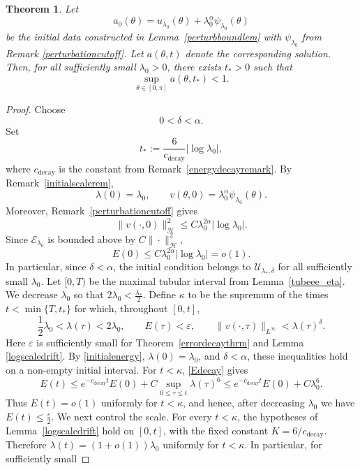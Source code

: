 \documentclass[11pt,a4paper]{article}
\numberwithin{equation}{section}
\theoremstyle{plain}
\newtheorem{theorem}{Theorem}[section]
\theoremstyle{remark}
\begin{document}
\begin{theorem}\label{eventualdropthm}
Let
$$
a_0(\theta)
=
u_{\lambda_0}(\theta)
+
\lambda_0^\alpha\psi_{\lambda_0}(\theta)
$$
be the initial data constructed in
Lemma~\ref{perturbboundlem} with $\psi_{\lambda_0}$ from Remark \ref{perturbationcutoff}. Let $a(\theta,t)$ denote
the corresponding solution. Then, for all
sufficiently small $\lambda_0>0$, there exists $t_*>0$ such that
$$
\sup_{\theta\in[0,\pi]}a(\theta,t_*)<1.
$$
\end{theorem}
\begin{proof}
Choose
$$
0<\delta<\alpha.
$$
Set
$$
t_*:=\frac{6}{c_{\mathrm{decay}}}\left|\log\lambda_0\right|,
$$
where $c_{\mathrm{decay}}$ is the constant from
Remark~\ref{energydecayremark}.
By Remark~\ref{initialscalerem},
$$
\lambda(0)=\lambda_0,
\qquad
v(\theta,0)
=
\lambda_0^\alpha\psi_{\lambda_0}(\theta).
$$
Moreover, Remark~\ref{perturbationcutoff} gives
$$
\|v(\cdot,0)\|_{\mathcal H}^2
\leq
C\lambda_0^{2\alpha}
\left|\log\lambda_0\right|.
$$
Since $\mathcal E_{\lambda_0}$ is bounded
above by $C\|\cdot\|_{\mathcal H}^2$,
\begin{equation}\label{initialenergy}
E(0)
\leq
C\lambda_0^{2\alpha}
\left|\log\lambda_0\right|
=
o(1).
\end{equation}
In particular, since $\delta<\alpha$, the initial condition belongs
to $\mathcal U_{\lambda_*,\delta}$ for all sufficiently small
$\lambda_0$.
Let $[0,T)$ be the maximal tubular interval from
Lemma~\ref{tubeee_eta}. We decrease $\lambda_0$ so that $2\lambda_0<\frac{\lambda_*}{2}$. Define $\kappa$ to be the supremum of the times
$t<\min\{T,t_*\}$ for which, throughout $[0,t]$,
$$
\frac12\lambda_0<\lambda(\tau)<2\lambda_0,
\qquad
E(\tau)<\varepsilon,
\qquad
\|v(\cdot,\tau)\|_{L^\infty}<\lambda(\tau)^\delta.
$$
Here $\varepsilon$ is sufficiently small for 
Theorem~\ref{errordecaythrm} and Lemma \ref{logscaledrift}. By
\eqref{initialenergy}, $\lambda(0)=\lambda_0$, and
$\delta<\alpha$, these inequalities hold on a non-empty initial
interval.
For $t<\kappa$, \eqref{Edecay} gives
$$
E(t)
\leq
e^{-c_{\mathrm{decay}} t}E(0)
+
C\sup_{0\leq \tau\leq t}\lambda(\tau)^6
\leq
e^{-c_{\mathrm{decay}} t}E(0)+C\lambda_0^6.
$$
Thus $E(t)=o(1)$ uniformly for $t<\kappa$, and hence, after
decreasing $\lambda_0$ we have $E(t)\leq\frac{\varepsilon}{2}$. We next control the scale. For every $t<\kappa$, the hypotheses of
Lemma~\ref{logscaledrift} hold on $[0,t]$, with the
fixed constant $K=6/c_{\mathrm{decay}}$. Therefore $\lambda(t)=(1+o(1))\lambda_0$ uniformly for $t<\kappa$. In particular, for sufficiently small

\end{proof}
\end{document}
